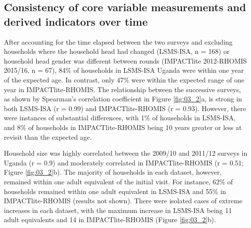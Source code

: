 \newpage

\subsection{Consistency of core variable measurements and derived indicators over time}

After accounting for the time elapsed between the two surveys and excluding households where the household head had changed (LSMS-ISA, n = 168) or household head gender was different between rounds (IMPACTlite 2012-RHOMIS 2015/16, n = 67), 84\% of households in LSMS-ISA Uganda were within one year of the expected age. In contrast, only 47\% were within the expected range of one year in IMPACTlite-RHOMIS. The relationship between the successive surveys, as shown by Spearman's correlation coefficient in Figure \ref{fig:03_2}a, is strong in both LSMS-ISA (r = 0.99) and IMPACTlite-RHOMIS (r = 0.93). However, there were instances of substantial differences, with 1\% of households in LSMS-ISA, and 8\% of households in IMPACTlite-RHOMIS being 10 years greater or less at revisit than the expected age.

Household size was highly correlated between the 2009/10 and 2011/12 surveys in Uganda (r = 0.9) and moderately correlated in IMPACTlite-RHOMIS (r = 0.51; Figure \ref{fig:03_2}b). The majority of households in each dataset, however, remained within one adult equivalent of the initial visit. For instance, 62\% of households remained within one adult equivalent in LSMS-ISA and 55\% in IMPACTlite-RHOMIS (results not shown). There were isolated cases of extreme increases in each dataset, with the maximum increase in LSMS-ISA being 11 adult equivalents and 14 in IMPACTlite-RHOMIS (Figure \ref{fig:03_2}b).

